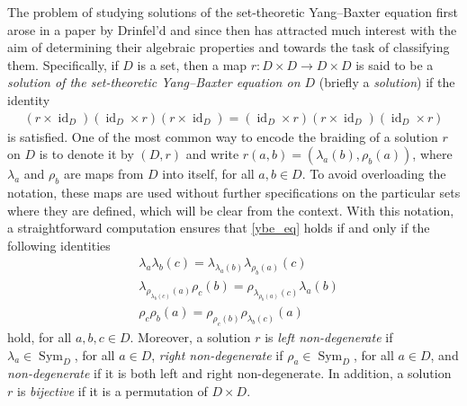 \documentclass[preprint,1p]{elsarticle}
\numberwithin{equation}{section}
\theoremstyle{definition}               %
\DeclareMathOperator{\Sym}{Sym}
\DeclareMathOperator{\id}{id}
\begin{document}
The problem of studying solutions of the set-theoretic Yang--Baxter equation first arose in a paper by Drinfel'd \cite{Dr92} and since then has attracted much interest with the aim of determining their algebraic properties and towards the task of classifying them.
Specifically, if $D$ is a set, then a map $r:D\times D\to D\times D$ is said to be  a \emph{solution of the set-theoretic Yang--Baxter equation on $D$} (briefly a \emph{solution}) if the identity
\begin{align}\label{ybe_eq}\tag{YBE}
\left(r\times\id_D\right)\left(\id_D\times r\right)\left(r\times\id_D\right)
=
\left(\id_D\times r\right)\left(r\times\id_D\right)\left(\id_D\times r\right)
\end{align}
is satisfied.
One of the most common way to encode the braiding of a solution $r$ on $D$ is to denote it by $\left(D,r\right)$ and write $r\left(a, b\right) = \left(\lambda_{a}\left(b\right), \rho_{b}\left(a\right)\right)$, where $\lambda_{a}$ and $\rho_{b}$ are maps from $D$ into itself, for all $a,b\in D$. 
To avoid overloading the notation, these maps are used without further specifications on the particular sets where they are defined, which will be clear from the context.
With this notation, a straightforward computation ensures that \eqref{ybe_eq} holds if and only if the following identities
\begin{align}
     &\label{first} \lambda_a\lambda_b(c)=\lambda_{\lambda_a\left(b\right)}\lambda_{\rho_b\left(a\right)}\left(c\right)\tag{Y1}\\
    &  \label{second}\lambda_{\rho_{\lambda_b\left(c\right)}\left(a\right)}\rho_c\left(b\right)=\rho_{\lambda_{\rho_b\left(a\right)}\left(c\right)}\lambda_a\left(b\right)\tag{Y2}\\
    &\label{third}\rho_c\rho_b(a)=\rho_{\rho_c\left(b\right)}\rho_{\lambda_b\left(c\right)}\left(a\right)\tag{Y3}\end{align} 
hold, for all $a,b,c \in D$. Moreover, a solution $r$ is \textit{left non-degenerate} if $\lambda_a \in \Sym_D$, for all $a \in D$, \textit{right non-degenerate} if $\rho_a \in \Sym_D$, for all $a \in D$, and \emph{non-degenerate} if it is both left and right non-degenerate. 
In addition, a solution $r$ is \textit{bijective} if it is a permutation of $D\times D$. 
\end{document}
